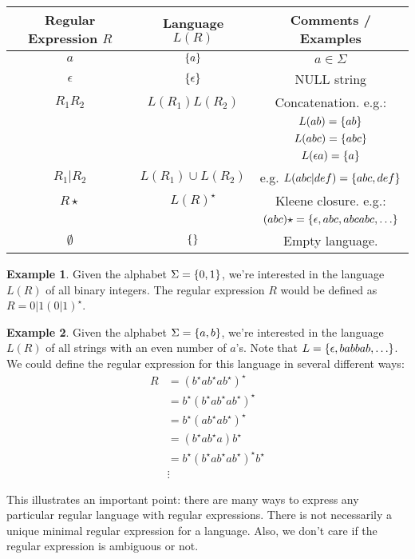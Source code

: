 \documentclass[]{article}
\DeclarePairedDelimiter{\set}{\lbrace}{\rbrace}
\theoremstyle{definition}
\newtheorem{ex}{Example}[section]
\begin{document}
			\begin{center}
				\begin{tabular}{c|c|c}
					Regular Expression $R$ & Language $L(R)$ & Comments / Examples \\ \hline
					$a$ & $\set{a}$ & $a \in \Sigma$ \\
					$\epsilon$ & $\set{\epsilon}$ &  NULL string \\
					$R_1 R_2$ & $L(R_1) L(R_2)$ & Concatenation. e.g.:  \\
					& & $L(ab) = \set{ab}$ \\
					& & $L(abc) = \set{abc}$ \\
					& & $L(\epsilon a) = \set{a}$ \\
					$R_1 | R_2$ & $L(R_1) \cup L(R_2)$ & e.g. $L(abc | def) = \set{abc, def}$ \\
					$R \star$ & $L(R)^\star$ & Kleene closure. e.g.: \\
					& & $(abc) \star = \set{\epsilon, abc, abcabc, \ldots}$ \\
					$\emptyset$ & $\set{}$ & Empty language.
				\end{tabular}
			\end{center}

			\begin{ex}
				Given the alphabet $\Sigma = \set{0, 1}$, we're interested in the language $L(R)$ of all binary integers. The regular expression $R$ would be defined as $R = 0 | 1(0 | 1)^\star$.
			\end{ex}

			\begin{ex}
				Given the alphabet $\Sigma = \set{a, b}$, we're interested in the language $L(R)$ of all strings with an even number of $a$'s. Note that $L = \set{\epsilon, babbab, \ldots}$. We could define the regular expression for this language in several different ways:
				\begin{align*}
					R &= (b^\star{} ab^\star{} ab^\star{})^\star \\
					&= b^\star{}(b^\star{}ab^\star{}ab^\star{})^\star \\
					&= b^\star{}(ab^\star{}ab^\star{})^\star \\
					&= (b^\star{}ab^\star{}a)b^\star \\
					&= b^\star{}(b^\star{}ab^\star{}ab^\star{})^\star{} b^\star \\
					&\vdots
				\end{align*}

				This illustrates an important point: there are many ways to express any particular regular language with regular expressions. There is not necessarily a unique minimal regular expression for a language. Also, we don't care if the regular expression is ambiguous or not.
			\end{ex}
			
\end{document}
